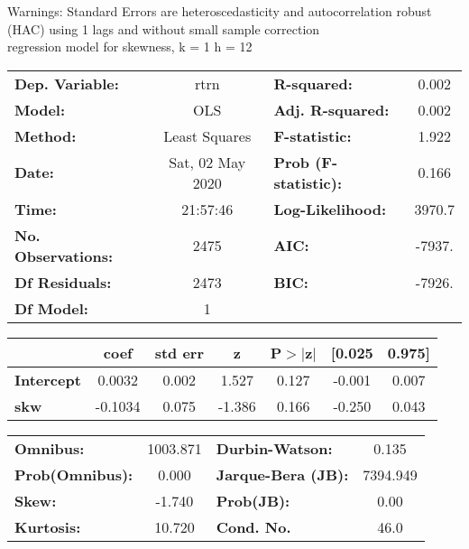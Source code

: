 Warnings: \newline
 [1] Standard Errors are heteroscedasticity and autocorrelation robust (HAC) using 1 lags and without small sample correction\\ 

regression model for skewness, k = 1 h = 12\begin{center}
\begin{tabular}{lclc}
\toprule
\textbf{Dep. Variable:}    &       rtrn       & \textbf{  R-squared:         } &     0.002   \\
\textbf{Model:}            &       OLS        & \textbf{  Adj. R-squared:    } &     0.002   \\
\textbf{Method:}           &  Least Squares   & \textbf{  F-statistic:       } &     1.922   \\
\textbf{Date:}             & Sat, 02 May 2020 & \textbf{  Prob (F-statistic):} &    0.166    \\
\textbf{Time:}             &     21:57:46     & \textbf{  Log-Likelihood:    } &    3970.7   \\
\textbf{No. Observations:} &        2475      & \textbf{  AIC:               } &    -7937.   \\
\textbf{Df Residuals:}     &        2473      & \textbf{  BIC:               } &    -7926.   \\
\textbf{Df Model:}         &           1      & \textbf{                     } &             \\
\bottomrule
\end{tabular}
\begin{tabular}{lcccccc}
                   & \textbf{coef} & \textbf{std err} & \textbf{z} & \textbf{P$> |$z$|$} & \textbf{[0.025} & \textbf{0.975]}  \\
\midrule
\textbf{Intercept} &       0.0032  &        0.002     &     1.527  &         0.127        &       -0.001    &        0.007     \\
\textbf{skw}       &      -0.1034  &        0.075     &    -1.386  &         0.166        &       -0.250    &        0.043     \\
\bottomrule
\end{tabular}
\begin{tabular}{lclc}
\textbf{Omnibus:}       & 1003.871 & \textbf{  Durbin-Watson:     } &    0.135  \\
\textbf{Prob(Omnibus):} &   0.000  & \textbf{  Jarque-Bera (JB):  } & 7394.949  \\
\textbf{Skew:}          &  -1.740  & \textbf{  Prob(JB):          } &     0.00  \\
\textbf{Kurtosis:}      &  10.720  & \textbf{  Cond. No.          } &     46.0  \\
\bottomrule
\end{tabular}
\end{center}

